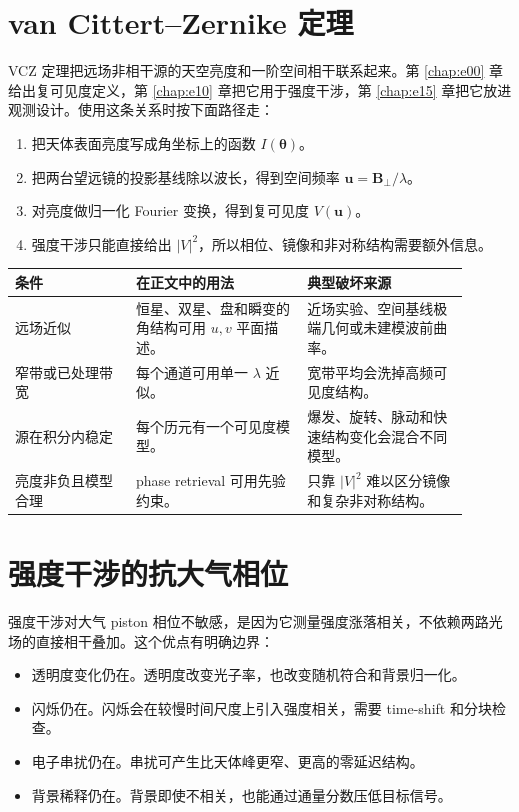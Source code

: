 \section{van Cittert--Zernike 定理}
\label{appsec:d-vcz}

VCZ 定理把远场非相干源的天空亮度和一阶空间相干联系起来。第 \ref{chap:e00} 章给出复可见度定义，第 \ref{chap:e10} 章把它用于强度干涉，第 \ref{chap:e15} 章把它放进观测设计。使用这条关系时按下面路径走：

\begin{enumerate}[leftmargin=*]
\item 把天体表面亮度写成角坐标上的函数 \(I(\boldsymbol\theta)\)。
\item 把两台望远镜的投影基线除以波长，得到空间频率 \(\boldsymbol u=\boldsymbol B_\perp/\lambda\)。
\item 对亮度做归一化 Fourier 变换，得到复可见度 \(V(\boldsymbol u)\)。
\item 强度干涉只能直接给出 \(|V|^2\)，所以相位、镜像和非对称结构需要额外信息。
\end{enumerate}

\begin{longtable}{p{0.24\linewidth}p{0.34\linewidth}p{0.32\linewidth}}
\toprule
条件 & 在正文中的用法 & 典型破坏来源 \\
\midrule
远场近似 & 恒星、双星、盘和瞬变的角结构可用 \(u,v\) 平面描述。 & 近场实验、空间基线极端几何或未建模波前曲率。 \\
窄带或已处理带宽 & 每个通道可用单一 \(\lambda\) 近似。 & 宽带平均会洗掉高频可见度结构。 \\
源在积分内稳定 & 每个历元有一个可见度模型。 & 爆发、旋转、脉动和快速结构变化会混合不同模型。 \\
亮度非负且模型合理 & phase retrieval 可用先验约束。 & 只靠 \(|V|^2\) 难以区分镜像和复杂非对称结构。 \\
\bottomrule
\end{longtable}

\section{强度干涉的抗大气相位}
\label{appsec:d-atmosphere}

强度干涉对大气 piston 相位不敏感，是因为它测量强度涨落相关，不依赖两路光场的直接相干叠加。这个优点有明确边界：

\begin{itemize}[leftmargin=*]
\item 透明度变化仍在。透明度改变光子率，也改变随机符合和背景归一化。
\item 闪烁仍在。闪烁会在较慢时间尺度上引入强度相关，需要 time-shift 和分块检查。
\item 电子串扰仍在。串扰可产生比天体峰更窄、更高的零延迟结构。
\item 背景稀释仍在。背景即使不相关，也能通过通量分数压低目标信号。
\end{itemize}

